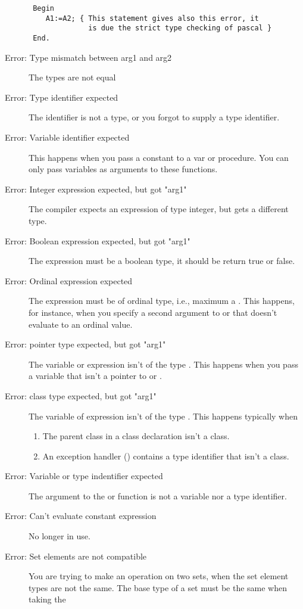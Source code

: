 \begin{description}
\begin{verbatim}
 Begin
    A1:=A2; { This statement gives also this error, it
              is due the strict type checking of pascal }
 End.
 \end{verbatim}
\item [Error: Type mismatch between arg1 and arg2]
 The types are not equal
\item [Error: Type identifier expected]
 The identifier is not a type, or you forgot to supply a type identifier.
\item [Error: Variable identifier expected]
 This happens when you pass a constant to a  var or 
 procedure. You can only pass variables as arguments to these functions.
\item [Error: Integer expression expected, but got "arg1"]
 The compiler expects an expression of type integer, but gets a different
 type.
\item [Error: Boolean expression expected, but got "arg1"]
 The expression must be a boolean type, it should be return true or
 false.
\item [Error: Ordinal expression expected]
 The expression must be of ordinal type, i.e., maximum a .
 This happens, for instance, when you specify a second argument
 to  or  that doesn't evaluate to an ordinal value.
\item [Error: pointer type expected, but got "arg1"]
 The variable or expression isn't of the type . This
 happens when you pass a variable that isn't a pointer to 
 or .
\item [Error: class type expected, but got "arg1"]
 The variable of expression isn't of the type . This happens
 typically when
 \begin{enumerate}
 \item The parent class in a class declaration isn't a class.
 \item An exception handler () contains a type identifier that
 isn't a class.
 \end{enumerate}
\item [Error: Variable or type indentifier expected]
 The argument to the  or  function is not a variable
 nor a type identifier.
\item [Error: Can't evaluate constant expression]
 No longer in use.
\item [Error: Set elements are not compatible]
 You are trying to make an operation on two sets, when the set element types
 are not the same. The base type of a set must be the same when taking the

\end{description}

